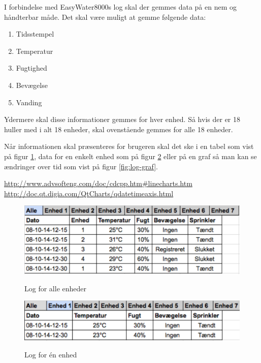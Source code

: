 
I forbindelse med EasyWater8000s log skal der gemmes data på en nem og håndterbar måde. Det skal være muligt at gemme følgende data:

\begin{enumerate}
	\item Tidsstempel
	\item Temperatur
	\item Fugtighed
	\item Bevægelse
	\item Vanding
\end{enumerate}

Ydermere skal disse informationer gemmes for hver enhed. Så hvis der er 18 huller med i alt 18 enheder, skal ovenstående gemmes for alle 18 enheder.

Når informationen skal præsenteres for brugeren skal det ske i en tabel som vist på figur \ref{fig:log-alle-enheder}, data for en enkelt enhed som på figur \ref{fig:log-enhed} eller på en graf så man kan se ændringer over tid som vist på figur \ref{fig:log-graf}.

\url{http://www.advsofteng.com/doc/cdcpp.htm#linecharts.htm} \newline
\url{http://doc.qt.digia.com/QtCharts/qdatetimeaxis.html}

\begin{figure}[htbp] \centering
{\includegraphics[scale=0.7]{filer/pics/SW-Log-alle}}
\caption{Log for alle enheder}
\label{fig:log-alle-enheder}
\end{figure}

\begin{figure}[htbp] \centering
{\includegraphics[scale=0.8]{filer/pics/SW-Log-enhed}}
\caption{Log for én enhed}
\label{fig:log-enhed}
\end{figure}

